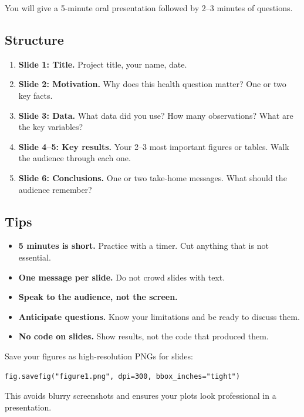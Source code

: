 You will give a 5-minute oral presentation followed by 2--3 minutes of questions.

\subsection{Structure}

\begin{enumerate}
  \item \textbf{Slide 1: Title.} Project title, your name, date.
  \item \textbf{Slide 2: Motivation.} Why does this health question matter? One or two key facts.
  \item \textbf{Slide 3: Data.} What data did you use? How many observations? What are the key variables?
  \item \textbf{Slide 4--5: Key results.} Your 2--3 most important figures or tables. Walk the audience through each one.
  \item \textbf{Slide 6: Conclusions.} One or two take-home messages. What should the audience remember?
\end{enumerate}

\subsection{Tips}

\begin{itemize}
  \item \textbf{5 minutes is short.} Practice with a timer. Cut anything that is not essential.
  \item \textbf{One message per slide.} Do not crowd slides with text.
  \item \textbf{Speak to the audience, not the screen.}
  \item \textbf{Anticipate questions.} Know your limitations and be ready to discuss them.
  \item \textbf{No code on slides.} Show results, not the code that produced them.
\end{itemize}

\begin{pythontip}
Save your figures as high-resolution PNGs for slides:
\begin{verbatim}
fig.savefig("figure1.png", dpi=300, bbox_inches="tight")
\end{verbatim}
This avoids blurry screenshots and ensures your plots look professional in a presentation.
\end{pythontip}

